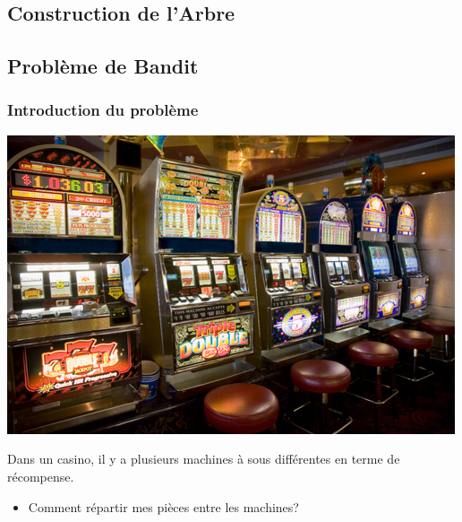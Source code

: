 \documentclass[compress, color = usenames, dvipsnames]{beamer}
\begin{document}
\subsection{Construction de l'Arbre}






\subsection{Problème de Bandit}

\begin{frame}
    \frametitle{Introduction du problème}
    \begin{center}
        \includegraphics[scale=0.8]{figs/bandit_casino.jpg}
    \end{center}
    Dans un casino, il y a plusieurs machines à sous différentes en terme de récompense.
    \begin{itemize}
        \item Comment répartir mes pièces entre les machines?
    \end{itemize}
\end{frame}
\end{document}
